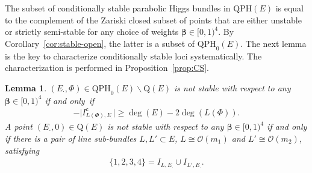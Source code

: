 \documentclass[pdftex]{sigma}
\newcommand{\calO}{\mathcal{O}}
\newcommand{\qp}{\boldsymbol{\cdot}}
\numberwithin{equation}{section}
\newtheorem{Lemma}[Theorem]{Lemma}
\begin{document}
The subset of conditionally stable parabolic Higgs bundles in $\mathrm{QPH}(E)$ is equal to the complement of the Zariski closed subset of points that are either unstable or strictly semi-stable for any choice of weights $\pmb{\beta}\in[0,1)^{4}$. By Corollary~\ref{cor:stable-open}, the latter is a subset of $\mathrm{QPH}_{0}(E)$. The next lemma is the key to characterize conditionally stable loci systematically. The characterization is performed in Proposition~\ref{prop:CS}.

\begin{Lemma}\label{lemma:not-stable}
$(E_{\qp},\Phi)\in\mathrm{QPH}_{0}(E)\backslash\mathrm{Q}(E)$ is not stable with respect to any $\pmb{\beta}\in[0,1)^{4}$ if and only~if
\begin{gather}\label{eq:not-stable}
-\big\vert I_{L(\Phi),E_{\qp}}^{\mathsf{c}}\big\vert \geq \deg(E)-2\deg(L(\Phi)).
\end{gather}
A point $(E_{\qp},0)\in\mathrm{Q}(E)$ is not stable with respect to any $\pmb{\beta}\in[0,1)^{4}$ if and only if there is a pair of line sub-bundles $L,L'\subset E$, $L\cong\calO(m_{1})$ and $L'\cong\calO(m_{2})$, satisfying
\begin{gather}\label{eq:L-L'}
\{1,2,3,4\} = I_{L,E_{\qp}}\cup I_{L',E_{\qp}}.
\end{gather}
\end{Lemma}
\end{document}
